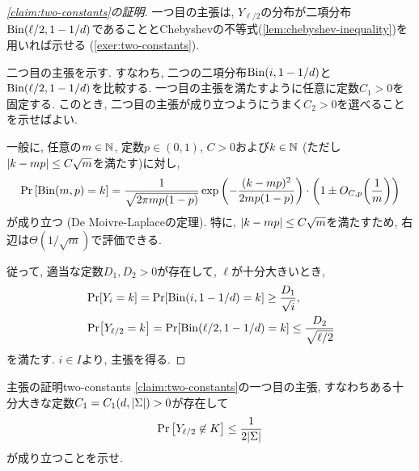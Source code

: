 \begin{proof}[\cref{claim:two-constants}の証明]
  一つ目の主張は, $Y_{\ell/2}$の分布が二項分布$\mathrm{Bin}(\ell/2,1-1/d)$であることとChebyshevの不等式(\cref{lem:chebyshev-inequality})を用いれば示せる (\cref{exer:two-constants}).

  二つ目の主張を示す. すなわち, 二つの二項分布$\mathrm{Bin}(i,1-1/d)$と$\mathrm{Bin}(\ell/2,1-1/d)$を比較する.
  一つ目の主張を満たすように任意に定数$C_1>0$を固定する.
  このとき, 二つ目の主張が成り立つようにうまく$C_2>0$を選べることを示せばよい.

  一般に, 任意の$m\in\mathbb{N}$, 定数$p\in(0,1)$, $C>0$および$k\in\mathbb{N}$ (ただし$\abs{k-mp}\le C\sqrt{m}$を満たす)に対し, 
  \begin{align}
    \Pr\qty[\mathrm{Bin}(m,p) = k] = \frac{1}{\sqrt{2\pi m p(1-p)}} \exp\qty( - \frac{(k-mp)^2}{2m p(1-p)} ) \cdot \qty(1\pm O_{C,p}\qty(\frac{1}{m})) \label{eq:de-moivre-laplace}
  \end{align}
  が成り立つ (De Moivre-Laplaceの定理).
  特に, $\abs{k-mp}\le C\sqrt{m}$を満たすため, 右辺は$\Theta(1/\sqrt{m})$で評価できる.
  
  従って, 適当な定数$D_1,D_2>0$が存在して, $\ell$が十分大きいとき,
  \begin{align*}
    &\Pr[Y_i=k]=\Pr[\mathrm{Bin}(i,1-1/d)=k] \ge \frac{D_1}{\sqrt{i}}, \\
    &\Pr[Y_{\ell/2}=k]=\Pr[\mathrm{Bin}(\ell/2,1-1/d)=k] \le \frac{D_2}{\sqrt{\ell/2}}
  \end{align*}
  を満たす. $i\in I$より, 主張を得る.    
\end{proof}

\begin{exercise}{主張の証明}{two-constants}
  \cref{claim:two-constants}の一つ目の主張, すなわちある十分大きな定数$C_1=C_1(d,\abs{\Sigma})>0$が存在して
  \begin{align*}
    \Pr\qty[Y_{\ell/2} \not\in K] \le \frac{1}{2\abs{\Sigma}}
  \end{align*}
  が成り立つことを示せ.
\end{exercise}

